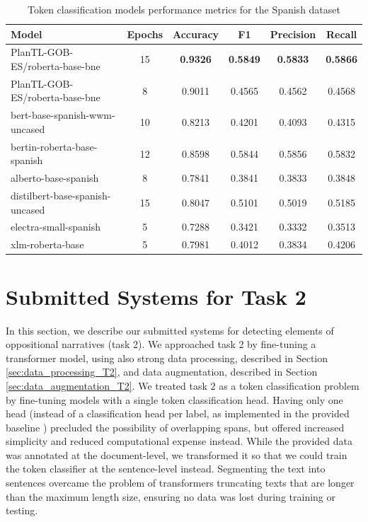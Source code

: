 \documentclass{Configuration_Files/PoliMi3i_thesis}
\begin{document}
\begin{table}[H]
    \centering
    \begin{tabular}{lccccc}
        \hline
        \textbf{Model} & \textbf{Epochs} & \textbf{Accuracy} & \textbf{F1} & \textbf{Precision} & \textbf{Recall} \\
        \hline
        PlanTL-GOB-ES/roberta-base-bne  & 15 & \textbf{0.9326} & \textbf{0.5849} & \textbf{0.5833} & \textbf{0.5866} \\
        PlanTL-GOB-ES/roberta-base-bne  & 8  & 0.9011 & 0.4565 & 0.4562 & 0.4568 \\  
        bert-base-spanish-wwm-uncased   & 10 & 0.8213 & 0.4201 & 0.4093 & 0.4315 \\  
        bertin-roberta-base-spanish     & 12 & 0.8598 & 0.5844 & 0.5856 & 0.5832  \\ 
        alberto-base-spanish            & 8 & 0.7841 & 0.3841 & 0.3833 & 0.3848 \\  
        distilbert-base-spanish-uncased & 15 & 0.8047 & 0.5101 & 0.5019 & 0.5185  \\ 
        electra-small-spanish           & 5 & 0.7288 & 0.3421 & 0.3332 & 0.3513  \\  
        xlm-roberta-base                & 5 & 0.7981 & 0.4012 & 0.3834 & 0.4206  \\ 
        \hline 
    \end{tabular}
    \caption{\small Token classification models performance metrics for the Spanish dataset}
    \label{tab:performance_train_es_T2}
\end{table}
\FloatBarrier


\section{Submitted Systems for Task 2} \label{sec:systask2}
In this section, we describe our submitted systems for detecting elements of oppositional narratives (task 2). We approached task 2 by fine-tuning a transformer model, using also strong data processing, described in Section \ref{sec:data_processing_T2}, and data augmentation, described in Section \ref{sec:data_augmentation_T2}.  We treated task 2 as a token classification problem by fine-tuning models with a single token classification head. Having only one head (instead of a classification head per label, as implemented in the provided baseline \cite{korencic2024oppositional}) precluded the possibility of overlapping spans, but offered increased simplicity and reduced computational expense instead.
While the provided data was annotated at the document-level, we transformed it so that we could train the token classifier at the sentence-level instead. Segmenting the text into sentences overcame the problem of transformers truncating texts that are longer than the maximum length size, ensuring no data was lost during training or testing. 
\end{document}
